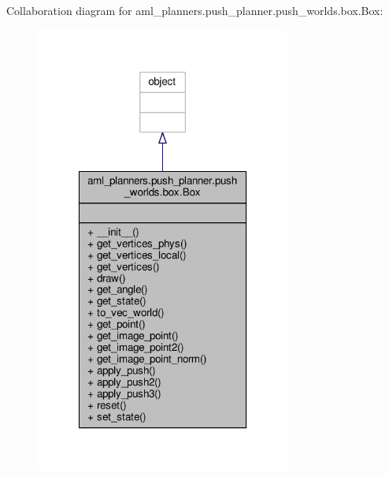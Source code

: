 Collaboration diagram for aml\-\_\-planners.\-push\-\_\-planner.\-push\-\_\-worlds.\-box.\-Box\-:
\nopagebreak
\begin{figure}[H]
\begin{center}
\leavevmode
\includegraphics[width=238pt]{classaml__planners_1_1push__planner_1_1push__worlds_1_1box_1_1_box__coll__graph}
\end{center}
\end{figure}
